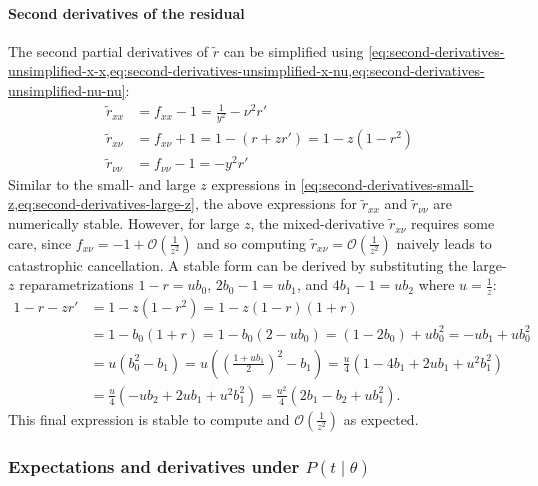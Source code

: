\documentclass{article}
\begin{document}
\paragraph{Second derivatives of the residual}\label{sec:second-derivatives-residual}

The second partial derivatives of $\tilde{r}$ can be simplified using \cref{eq:second-derivatives-unsimplified-x-x,eq:second-derivatives-unsimplified-x-nu,eq:second-derivatives-unsimplified-nu-nu}:
%
\begin{align}
  \tilde{r}_{xx}     & = f_{xx} - 1 = \frac{1}{y^2} - \nu^2 r'          \\
  \tilde{r}_{x\nu}   & = f_{x\nu} + 1 = 1 - (r + z r') = 1 - z(1 - r^2) \\
  \tilde{r}_{\nu\nu} & = f_{\nu\nu} - 1 = - y^2 r'
\end{align}
%
Similar to the small- and large $z$ expressions in \cref{eq:second-derivatives-small-z,eq:second-derivatives-large-z}, the above expressions for $\tilde{r}_{xx}$ and $\tilde{r}_{\nu\nu}$ are numerically stable.
However, for large $z$, the mixed-derivative $\tilde{r}_{x\nu}$ requires some care, since $f_{x\nu} = -1 + \mathcal{O}(\frac{1}{z^2})$ and so computing $\tilde{r}_{x\nu} = \mathcal{O}(\frac{1}{z^2})$ naively leads to catastrophic cancellation.
A stable form can be derived by substituting the large-$z$ reparametrizations $1 - r = u b_0$, $2 b_0 - 1 = u b_1$, and $4 b_1 - 1 = u b_2$ where $u = \frac{1}{z}$:
%
\begin{align}
  1 - r - z r' & = 1 - z(1 - r^2) = 1 - z(1 - r)(1 + r)                                                                                            \\
               & = 1 - b_0 (1 + r) = 1 - b_0(2 - u b_0) = (1 - 2 b_0) + u b_0^2 = -u b_1 + u b_0^2                                                 \\
               & = u (b_0^2 - b_1) = u ((\frac{1 + u b_1}{2})^2 - b_1) = \frac{u}{4} (1 - 4b_1 + 2u b_1 + u^2 b_1^2)                               \\
               & = \frac{u}{4}(-u b_2 + 2u b_1 + u^2 b_1^2) = \frac{u^2}{4}(2 b_1 - b_2 + u b_1^2). \label{eq:one-minus-r-minus-z-r-prime-large-z}
\end{align}
%
This final expression is stable to compute and $\mathcal{O}(\frac{1}{z^2})$ as expected.

\subsubsection{Expectations and derivatives under $P(t \mid \theta)$}
\end{document}
